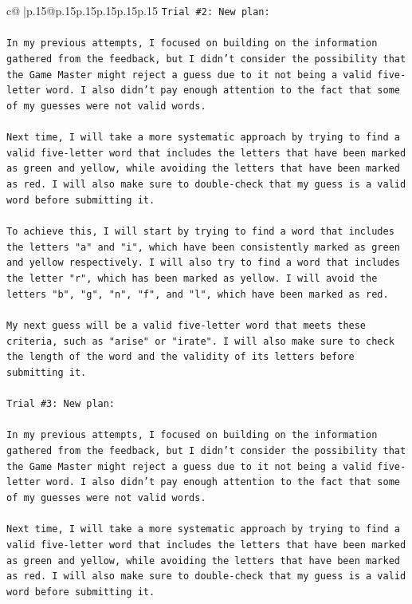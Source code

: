 \documentclass{article}
\begin{document}
{\begin{supertabular}{c@{$\;$}|p{.15\linewidth}@{}p{.15\linewidth}p{.15\linewidth}p{.15\linewidth}p{.15\linewidth}p{.15\linewidth}}
{{{\texttt{Trial \#2: New plan: } \\
\\ 
\texttt{In my previous attempts, I focused on building on the information gathered from the feedback, but I didn't consider the possibility that the Game Master might reject a guess due to it not being a valid five{-}letter word. I also didn't pay enough attention to the fact that some of my guesses were not valid words.} \\
\\ 
\texttt{Next time, I will take a more systematic approach by trying to find a valid five{-}letter word that includes the letters that have been marked as green and yellow, while avoiding the letters that have been marked as red. I will also make sure to double{-}check that my guess is a valid word before submitting it.} \\
\\ 
\texttt{To achieve this, I will start by trying to find a word that includes the letters "a" and "i", which have been consistently marked as green and yellow respectively. I will also try to find a word that includes the letter "r", which has been marked as yellow. I will avoid the letters "b", "g", "n", "f", and "l", which have been marked as red.} \\
\\ 
\texttt{My next guess will be a valid five{-}letter word that meets these criteria, such as "arise" or "irate". I will also make sure to check the length of the word and the validity of its letters before submitting it.} \\
\\ 
\texttt{Trial \#3: New plan: } \\
\\ 
\texttt{In my previous attempts, I focused on building on the information gathered from the feedback, but I didn't consider the possibility that the Game Master might reject a guess due to it not being a valid five{-}letter word. I also didn't pay enough attention to the fact that some of my guesses were not valid words.} \\
\\ 
\texttt{Next time, I will take a more systematic approach by trying to find a valid five{-}letter word that includes the letters that have been marked as green and yellow, while avoiding the letters that have been marked as red. I will also make sure to double{-}check that my guess is a valid word before submitting it.} \\
\\ 
}}}
\end{supertabular}}
\end{document}
